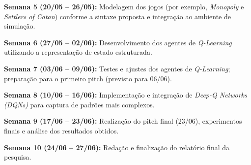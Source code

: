 \documentclass[10pt,a4paper]{article}
\begin{document}
\vspace{0.5em}

\textbf{Semana 5 (20/05 -- 26/05):} Modelagem dos jogos (por exemplo, \textit{Monopoly} e \textit{Settlers of Catan}) conforme a sintaxe proposta e integração ao ambiente de simulação.

\vspace{0.5em}

\textbf{Semana 6 (27/05 -- 02/06):} Desenvolvimento dos agentes de \textit{Q-Learning} utilizando a representação de estado estruturada.

\vspace{0.5em}

\textbf{Semana 7 (03/06 -- 09/06):} Testes e ajustes dos agentes de \textit{Q-Learning}; preparação para o primeiro pitch (previsto para 06/06).

\vspace{0.5em}

\textbf{Semana 8 (10/06 -- 16/06):} Implementação e integração de \textit{Deep-Q Networks (DQNs)} para captura de padrões mais complexos.

\vspace{0.5em}

\textbf{Semana 9 (17/06 -- 23/06):} Realização do pitch final (23/06), experimentos finais e análise dos resultados obtidos.

\vspace{0.5em}

\textbf{Semana 10 (24/06 -- 27/06):} Redação e finalização do relatório final da pesquisa.

\printbibliography
\end{document}
